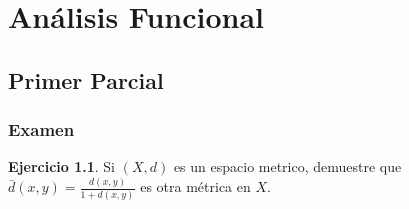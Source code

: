 \documentclass[11pt,a4paper,oneside]{report}
\theoremstyle{definition}
\newtheorem{ejercicio}[definicion]{Ejercicio}
\theoremstyle{plain}
\theoremstyle{remark}
\begin{document}
\part{Análisis Funcional}

\chapter{Primer Parcial}

\section{Examen}

\begin{ejercicio}
Si $(X, d)$ es un espacio metrico, demuestre que $\bar{d}(x,y)=\frac{d(x,y)}{1+d(x,y)}$
es otra métrica en $X$.
\end{ejercicio}
\end{document}
